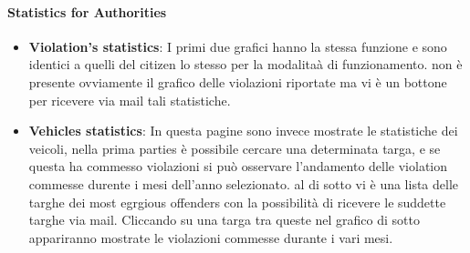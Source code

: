 \documentclass{article}
\begin{document}
\paragraph{Statistics for Authorities}
\begin{itemize}
    \item \textbf{Violation's statistics}: I primi due grafici hanno la stessa funzione e sono identici a quelli del
    citizen lo stesso per la modalitaà di funzionamento. non è presente ovviamente il grafico delle violazioni riportate
    ma vi è un bottone per ricevere via mail tali statistiche.
    \item \textbf{Vehicles statistics}: In questa pagine sono invece mostrate le statistiche dei veicoli, nella prima parties
    è possibile cercare una determinata targa, e se questa ha commesso violazioni si può osservare l'andamento delle violation
    commesse durente i mesi dell'anno selezionato. al di sotto vi è una lista delle targhe dei most egrgious offenders 
    con la possibilità di ricevere le suddette targhe via mail. Cliccando su una targa tra queste nel grafico di sotto 
    appariranno mostrate le violazioni commesse durante i vari mesi.
\end{itemize}
\end{document}

